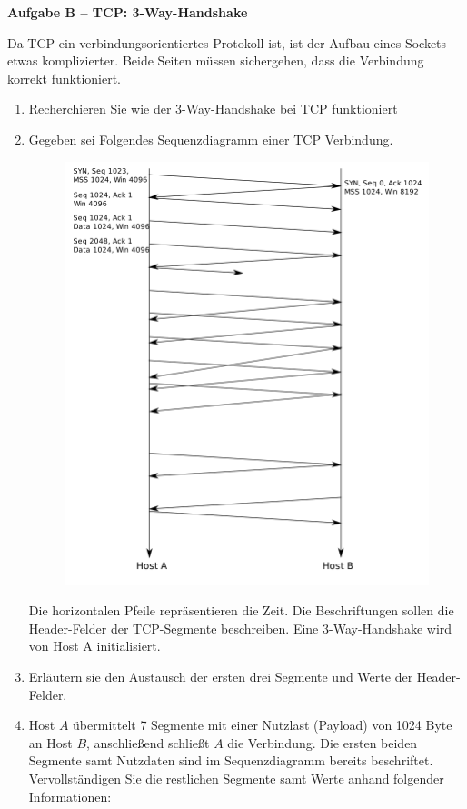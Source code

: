 \documentclass[paper=a4,fontsize=11pt]{scrartcl}%
\numberwithin{equation}{section}
\begin{document}
\begin{center}\Large{\textbf{Aufgabe B -- TCP: 3-Way-Handshake}}\end{center}\vskip0.2in
Da TCP ein verbindungsorientiertes Protokoll ist, ist der Aufbau eines Sockets etwas komplizierter. Beide Seiten müssen sichergehen, dass die Verbindung korrekt funktioniert.
\begin{enumerate}
	\item Recherchieren Sie wie der 3-Way-Handshake bei TCP funktioniert \cite[Kap. 3.5]{Kurose2012}
	\item Gegeben sei Folgendes Sequenzdiagramm einer TCP Verbindung.
	\begin{figure}[H]
		\centering
		\includegraphics[scale=0.3]{handshake}
	\end{figure}
	Die horizontalen Pfeile repräsentieren die Zeit. Die Beschriftungen sollen die Header-Felder der TCP-Segmente beschreiben. Eine 3-Way-Handshake wird von Host A initialisiert.
	\item Erläutern sie den Austausch der ersten drei Segmente und Werte der Header-Felder.
	\item Host $A$ übermittelt 7 Segmente mit einer Nutzlast (Payload) von 1024 Byte an Host $B$, anschließend schließt $A$ die Verbindung. Die ersten beiden Segmente samt Nutzdaten sind im Sequenzdiagramm bereits beschriftet. Vervollständigen Sie die restlichen Segmente samt Werte anhand folgender Informationen:

\end{enumerate}
\end{document}
